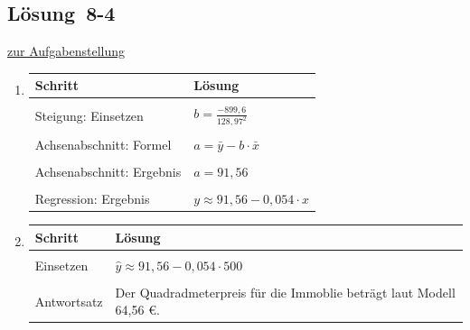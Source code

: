 \documentclass[
  11pt,
  ngerman,
  a4paper,
]{report}
\begin{document}
\hypertarget{loesung-8-4}{%
\subsection{Lösung~8-4}\label{loesung-8-4}}

\protect\hyperlink{aufgabe-8-4}{zur Aufgabenstellung}

\begin{enumerate}
\def\labelenumi{\alph{enumi})}
\item
  \begin{table}[H]
    \centering
    \begin{tabular}{>{\raggedright\arraybackslash}p{8cm}>{\raggedright\arraybackslash}p{8cm}}
    \toprule
    \textbf{Schritt} & \textbf{Lösung}\\
    \midrule
    \cellcolor{gray!6}{Steigung: Formel} & \cellcolor{gray!6}{$b=\frac{s_{xy}}{s^2_x}$}\\
    Steigung: Einsetzen & $b=\frac{-899{,}6}{128{,}97^2}$\\
    \cellcolor{gray!6}{Steigung: Ergebnis} & \cellcolor{gray!6}{$b=-0{,}05$}\\
    Achsenabschnitt: Formel & $a=\bar{y}-b\cdot\bar{x}$\\
    \cellcolor{gray!6}{Achsenabschnitt: Einsetzen} & \cellcolor{gray!6}{$a=41{,}83+0{,}054\cdot921$}\\
    Achsenabschnitt: Ergebnis & $a=91{,}56$\\
    \cellcolor{gray!6}{Regression: Formel} & \cellcolor{gray!6}{$y=a + b \cdot x$}\\
    Regression: Ergebnis & $y \approx 91{,}56 -0{,}054 \cdot x$\\
    \bottomrule
    \end{tabular}
    \end{table}
\item
  \begin{table}[H]
    \centering
    \begin{tabular}{l>{\raggedright\arraybackslash}p{8cm}}
    \toprule
    \textbf{Schritt} & \textbf{Lösung}\\
    \midrule
    \cellcolor{gray!6}{Formel} & \cellcolor{gray!6}{$\hat{y}= 91{,}56 -0{,}054 \cdot x$}\\
    Einsetzen & $\hat{y}\approx 91{,}56 -0{,}054 \cdot 500$\\
    \cellcolor{gray!6}{Ergenbis} & \cellcolor{gray!6}{$\hat{y}\approx64{,}56$}\\
    Antwortsatz & Der Quadradmeterpreis für die Immoblie beträgt laut Modell 64,56 €.\\
    \bottomrule
    \end{tabular}
    \end{table}
\end{enumerate}
\end{document}
